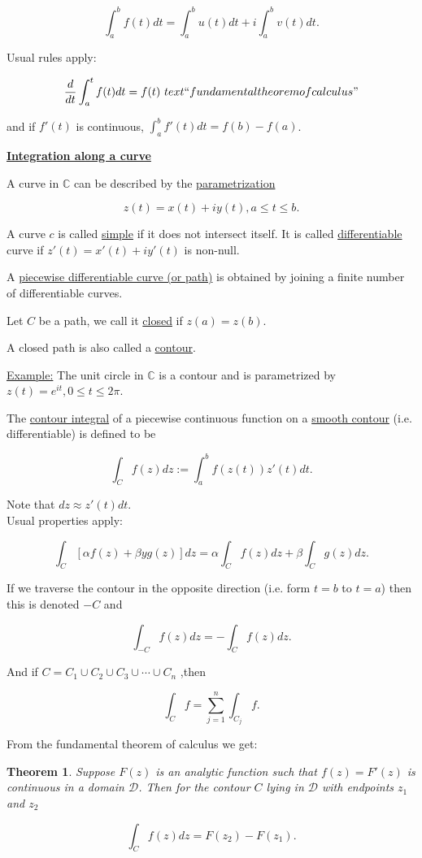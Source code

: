 \documentclass[twoside]{article}
\newcounter{lecnum}
\newtheorem{theorem}{Theorem}[lecnum]
\begin{document}
$$\int^b_af(t)dt=\int^b_au(t)dt+i\int^b_av(t)dt.$$

Usual rules apply:

$$\frac{d}{dt}\int^t_a f(t)dt=f(t)\ text{``fundamental theorem of calculus"}$$

and if $f'(t)$ is continuous, $\int^b_af'(t)dt=f(b)-f(a)$.

\underline{\textbf{Integration along a curve}}

A curve in $\mathbb{C}$ can be described by the \underline{parametrization}

$$z(t)=x(t)+iy(t), a\leq t\leq b.$$

A curve $c$ is called \underline{simple} if it does not intersect itself. It is called \underline{differentiable} curve if $z'(t)=x'(t)+iy'(t)$ is non-null.

A \underline{piecewise differentiable curve (or path)} is obtained by joining a finite number of differentiable curves.

Let $C$ be a path, we call it \underline{closed} if $z(a)=z(b)$.

A closed path is also called a \underline{contour}.

\underline{Example:} The unit circle in $\mathbb{C}$ is a contour and is parametrized by $z(t)=e^{it}, 0\leq t\leq 2\pi$.

The \underline{contour integral} of a piecewise continuous function on a \underline{smooth contour} (i.e. differentiable) is defined to be

$$\int_C f(z)dz:=\int^b_af(z(t))z'(t)dt.$$

Note that $dz\approx z'(t)dt$.\\

Usual properties apply:

$$\int_C[\alpha f(z)+\beta yg(z)]dz = \alpha\int_C f(z)dz + \beta \int_C g(z)dz.$$

If  we traverse the contour in the opposite direction (i.e. form $t=b$ to $t=a$) then this is denoted $-C$ and

$$\int_{-C} f(z)dz = -\int_C f(z)dz.$$

And if $C=C_1\cup C_2\cup C_3\cup \cdots \cup C_n$ ,then

$$\int_C f=\sum^n_{j=1} \int_{C_j} f.$$

From the fundamental theorem of calculus we get:

\begin{theorem}
	Suppose $F(z)$ is an analytic function such that $f(z)=F'(z)$ is continuous in a domain $\mathcal{D}$. Then for the contour $C$ lying in $\mathcal{D}$ with endpoints $z_1$ and $z_2$
	
	$$\int_C f(z)dz=F(z_2)-F(z_1).$$
\end{theorem}
\end{document}
